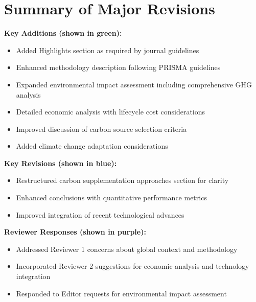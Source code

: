 \documentclass[12pt,a4paper]{article}
\begin{document}
\clearpage

\section*{Summary of Major Revisions}

\textbf{\textcolor{addedtext}{Key Additions (shown in green):}}
\begin{itemize}
\item Added Highlights section as required by journal guidelines
\item Enhanced methodology description following PRISMA guidelines
\item Expanded environmental impact assessment including comprehensive GHG analysis
\item Detailed economic analysis with lifecycle cost considerations
\item Improved discussion of carbon source selection criteria
\item Added climate change adaptation considerations
\end{itemize}

\textbf{\textcolor{replacedtext}{Key Revisions (shown in blue):}}
\begin{itemize}
\item Restructured carbon supplementation approaches section for clarity
\item Enhanced conclusions with quantitative performance metrics
\item Improved integration of recent technological advances
\end{itemize}

\textbf{\textcolor{commenttext}{Reviewer Responses (shown in purple):}}
\begin{itemize}
\item Addressed Reviewer 1 concerns about global context and methodology
\item Incorporated Reviewer 2 suggestions for economic analysis and technology integration
\item Responded to Editor requests for environmental impact assessment
\end{itemize}

% 
% 
\end{document}
